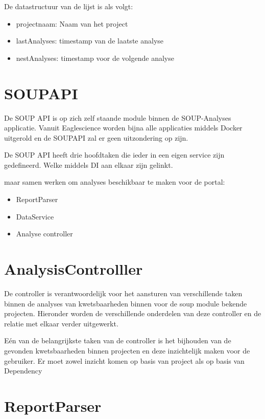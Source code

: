 De datastructuur van de lijst is als volgt:
\begin{itemize}
    \item projectnaam: Naam van het project
    \item lastAnalyses: timestamp van de laatste analyse
    \item nestAnalyses: timestamp voor de volgende analyse
\end{itemize}





\section{SOUPAPI}\label{sec:soupapi}
De SOUP API is op zich zelf staande module binnen de SOUP-Analyses applicatie. Vanuit Eaglescience worden bijna alle applicaties middels Docker uitgerold en de SOUPAPI zal er geen uitzondering op zijn.

De SOUP API heeft drie hoofdtaken die ieder in een eigen service zijn gedefineerd. Welke middels DI aan elkaar zijn gelinkt.

maar samen werken om analyses beschikbaar te maken voor de portal:
\begin{itemize}
    \item ReportParser
    \item DataService
    \item Analyse controller
\end{itemize}





\section{AnalysisControlller}\label{sec:Implcontroller}
De controller is verantwoordelijk voor het aansturen van verschillende taken binnen de analyses van kwetsbaarheden binnen voor de soup module bekende projecten. Hieronder worden de verschillende onderdelen van deze controller en de relatie met elkaar verder uitgewerkt.

Eén van de belangrijkste taken van de controller is het bijhouden van de gevonden kwetsbaarheden binnen projecten en deze inzichtelijk maken voor de gebruiker. Er moet zowel inzicht komen op basis van project als op basis van Dependency

\section{ReportParser}



